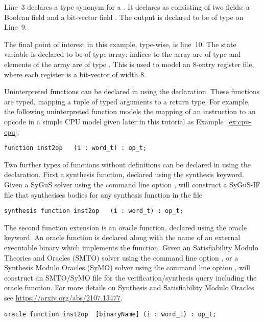 Line~3 declares a type synonym for a . It declares  as consisting of two fields: a Boolean field  and a bit-vector field . The output  is declared to be of type  on Line~9.

The final point of interest in this example, type-wise, is line~10. The state variable  is declared to be of type array: indices to the array are of type  and elements of the array are of type . This is used to model an 8-entry register file, where each register is a bit-vector of width 8.

Uninterpreted functions can be declared in \uclid{} using the
 declaration. These functions are typed,
mapping a tuple of typed arguments to a return type.
For example, the following uninterpreted function models
the mapping of an instruction to an opcode in a simple
CPU model given later in this tutorial as Example~\ref{ex:cpu-cpu}.
\begin{lstlisting}[language=uclid,style=uclidstyle]
  function inst2op   (i : word_t) : op_t;
\end{lstlisting}

Two further types of functions without definitions can be declared in \uclid{} using the
 declaration. 
First a synthesis function, declared using the synthesis keyword. Given a SyGuS solver using the command line option ,
\uclid{} will construct
a SyGuS-IF file that synthesises bodies for any synthesis function in the \uclid{} file
\begin{lstlisting}[language=uclid,style=uclidstyle]
  synthesis function inst2op   (i : word_t) : op_t;
\end{lstlisting}

The second function extension is an oracle function, declared using the oracle keyword. An oracle function is declared along with the name of an external executable binary which implements the function. Given an Satisfiability Modulo Theories and Oracles (SMTO) solver using the command line option , or a Synthesis Modulo Oracles (SyMO) solver using the command line option ,
\uclid{} will construct
an SMTO/SyMO file for the verification/synthesis query including the oracle function. For more details on Synthesis and Satisfiability Modulo Oracles see \url{https://arxiv.org/abs/2107.13477}.
\begin{lstlisting}[language=uclid,style=uclidstyle]
  oracle function inst2op  [binaryName] (i : word_t) : op_t;
\end{lstlisting}

